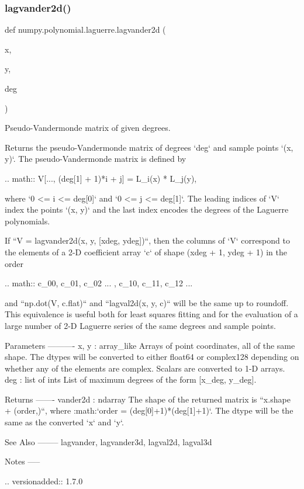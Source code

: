 \subsubsection{\texorpdfstring{lagvander2d()}{lagvander2d()}}
{\footnotesize\ttfamily def numpy.\+polynomial.\+laguerre.\+lagvander2d (\begin{DoxyParamCaption}\item[{}]{x,  }\item[{}]{y,  }\item[{}]{deg }\end{DoxyParamCaption})}

\begin{DoxyVerb}Pseudo-Vandermonde matrix of given degrees.

Returns the pseudo-Vandermonde matrix of degrees `deg` and sample
points `(x, y)`. The pseudo-Vandermonde matrix is defined by

.. math:: V[..., (deg[1] + 1)*i + j] = L_i(x) * L_j(y),

where `0 <= i <= deg[0]` and `0 <= j <= deg[1]`. The leading indices of
`V` index the points `(x, y)` and the last index encodes the degrees of
the Laguerre polynomials.

If ``V = lagvander2d(x, y, [xdeg, ydeg])``, then the columns of `V`
correspond to the elements of a 2-D coefficient array `c` of shape
(xdeg + 1, ydeg + 1) in the order

.. math:: c_{00}, c_{01}, c_{02} ... , c_{10}, c_{11}, c_{12} ...

and ``np.dot(V, c.flat)`` and ``lagval2d(x, y, c)`` will be the same
up to roundoff. This equivalence is useful both for least squares
fitting and for the evaluation of a large number of 2-D Laguerre
series of the same degrees and sample points.

Parameters
----------
x, y : array_like
    Arrays of point coordinates, all of the same shape. The dtypes
    will be converted to either float64 or complex128 depending on
    whether any of the elements are complex. Scalars are converted to
    1-D arrays.
deg : list of ints
    List of maximum degrees of the form [x_deg, y_deg].

Returns
-------
vander2d : ndarray
    The shape of the returned matrix is ``x.shape + (order,)``, where
    :math:`order = (deg[0]+1)*(deg[1]+1)`.  The dtype will be the same
    as the converted `x` and `y`.

See Also
--------
lagvander, lagvander3d, lagval2d, lagval3d

Notes
-----

.. versionadded:: 1.7.0\end{DoxyVerb}
 \mbox{\label{namespacenumpy_1_1polynomial_1_1laguerre_a0671cd9891d0a6dfc5f03f020460ff33}} 

